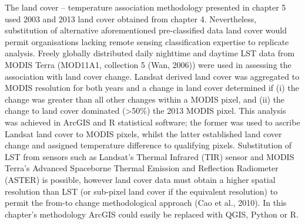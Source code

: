 \documentclass[]{book}
\begin{document}
The land cover -- temperature association methodology presented in
chapter 5 used 2003 and 2013 land cover obtained from chapter 4.
Nevertheless, substitution of alternative aforementioned pre-classified
data land cover would permit organisations lacking remote sensing
classification expertise to replicate analysis. Freely globally
distributed daily nighttime and daytime LST data from MODIS Terra
(MOD11A1, collection 5 (Wan, 2006)) were used in assessing the
association with land cover change. Landsat derived land cover was
aggregated to MODIS resolution for both years and a change in land cover
determined if (i) the change was greater than all other changes within a
MODIS pixel, and (ii) the change to land cover dominated
(\textgreater{}50\%) the 2013 MODIS pixel. This analysis was achieved in
ArcGIS and R statistical software; the former was used to ascribe
Landsat land cover to MODIS pixels, whilst the latter established land
cover change and assigned temperature difference to qualifying pixels.
Substitution of LST from sensors such as Landsat's Thermal Infrared
(TIR) sensor and MODIS Terra's Advanced Spaceborne Thermal Emission and
Reflection Radiometer (ASTER) is possible, however land cover data must
obtain a higher spatial resolution than LST (or sub-pixel land cover if
the equivalent resolution) to permit the from-to change methodological
approach (Cao et al., 2010). In this chapter's methodology ArcGIS could
easily be replaced with QGIS, Python or R.
\end{document}
